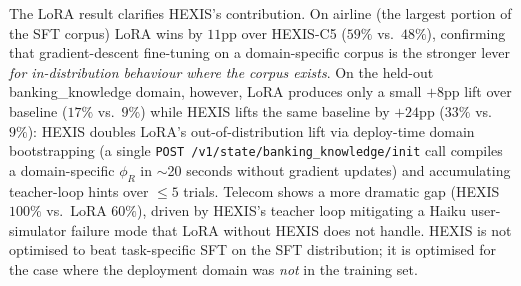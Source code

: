 The LoRA result clarifies HEXIS's contribution. On airline (the largest portion of the SFT corpus) LoRA wins by $11$pp over HEXIS-C5 ($59\%$ vs.\ $48\%$), confirming that gradient-descent fine-tuning on a domain-specific corpus is the stronger lever \emph{for in-distribution behaviour where the corpus exists}. On the held-out banking\_knowledge domain, however, LoRA produces only a small $+8$pp lift over baseline ($17\%$ vs.\ $9\%$) while HEXIS lifts the same baseline by $+24$pp ($33\%$ vs.\ $9\%$): HEXIS doubles LoRA's out-of-distribution lift via deploy-time domain bootstrapping (a single \texttt{POST /v1/state/banking\_knowledge/init} call compiles a domain-specific $\phi_R$ in $\sim$20 seconds without gradient updates) and accumulating teacher-loop hints over $\leq 5$ trials. Telecom shows a more dramatic gap (HEXIS $100\%$ vs.\ LoRA $60\%$), driven by HEXIS's teacher loop mitigating a Haiku user-simulator failure mode that LoRA without HEXIS does not handle. HEXIS is not optimised to beat task-specific SFT on the SFT distribution; it is optimised for the case where the deployment domain was \emph{not} in the training set.

